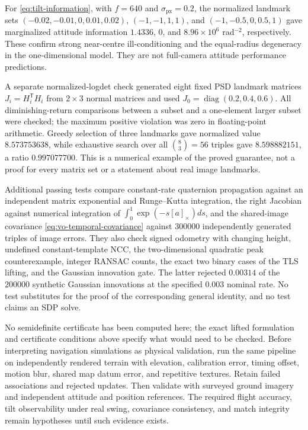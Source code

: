 For \eqref{eq:tilt-information}, with $f=640$ and
$\sigma_{\mathrm{px}}=0.2$, the normalized landmark sets
$(-0.02,-0.01,0,0.01,0.02)$,
$(-1,-1,1,1)$, and $(-1,-0.5,0,0.5,1)$ gave marginalized attitude
information $1.4336$, $0$, and $8.96\times10^6$ rad$^{-2}$,
respectively. These confirm strong near-centre ill-conditioning and
the equal-radius degeneracy in the one-dimensional model. They are not
full-camera attitude performance predictions.

A separate normalized-logdet check generated eight fixed PSD landmark
matrices $J_i=H_i^{\mathsf T}H_i$ from $2\times3$ normal matrices and
used $J_0=\operatorname{diag}(0.2,0.4,0.6)$. All diminishing-return
comparisons between a subset and a one-element larger subset were
checked; the maximum positive violation was zero in floating-point
arithmetic. Greedy selection of three landmarks gave normalized value
$8.573753638$, while exhaustive search over all $\binom83=56$ triples
gave $8.598882151$, a ratio $0.997077700$. This is a numerical example
of the proved guarantee, not a proof for every matrix set or a statement
about real image landmarks.

Additional passing tests compare constant-rate quaternion propagation
against an independent matrix exponential and Runge--Kutta integration,
the right Jacobian against numerical integration of
$\int_0^1\exp(-s[a]_\times)ds$, and the shared-image covariance
\eqref{eq:vo-temporal-covariance} against $300000$ independently generated
triples of image errors. They also check signed odometry with changing
height, undefined constant-template NCC, the two-dimensional quadratic
peak counterexample, integer RANSAC counts, the exact two binary cases
of the TLS lifting, and the Gaussian innovation gate. The latter
rejected $0.00314$ of the $200000$ synthetic Gaussian innovations at
the specified $0.003$ nominal rate. No test substitutes for the proof
of the corresponding general identity, and no test claims an SDP solve.

No semidefinite certificate has been computed here; the exact lifted
formulation and certificate conditions above specify what would need
to be checked. Before interpreting navigation simulations as physical
validation, run the same pipeline on independently rendered terrain
with elevation, calibration error, timing offset, motion blur, shared
map datum error, and repetitive textures. Retain failed associations
and rejected updates. Then validate with surveyed ground imagery and
independent attitude and position references. The required flight
accuracy, tilt observability under real swing, covariance consistency,
and match integrity remain hypotheses until such evidence exists.
